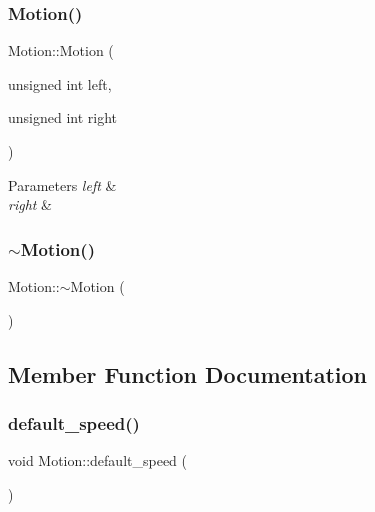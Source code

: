 \subsubsection{\texorpdfstring{Motion()}{Motion()}\hspace{0.1cm}{\footnotesize\ttfamily [2/2]}}
{\footnotesize\ttfamily Motion\+::\+Motion (\begin{DoxyParamCaption}\item[{unsigned int}]{left,  }\item[{unsigned int}]{right }\end{DoxyParamCaption})}


\begin{DoxyParams}{Parameters}
{\em left} & \\
\hline
{\em right} & \\
\hline
\end{DoxyParams}
\mbox{\label{class_motion_a3989871f9b2b9b69c88b5437b40a72c6}} 
\subsubsection{\texorpdfstring{$\sim$\+Motion()}{~Motion()}}
{\footnotesize\ttfamily Motion\+::$\sim$\+Motion (\begin{DoxyParamCaption}{ }\end{DoxyParamCaption})}



\subsection{Member Function Documentation}
\mbox{\label{class_motion_a2eed1fd2eec8bec50c587b2ab33f23b8}} 
\subsubsection{\texorpdfstring{default\+\_\+speed()}{default\_speed()}}
{\footnotesize\ttfamily void Motion\+::default\+\_\+speed (\begin{DoxyParamCaption}{ }\end{DoxyParamCaption})}

\mbox{\label{class_motion_a44ce916fa9aad6277f0990b14a4259ef}} 
